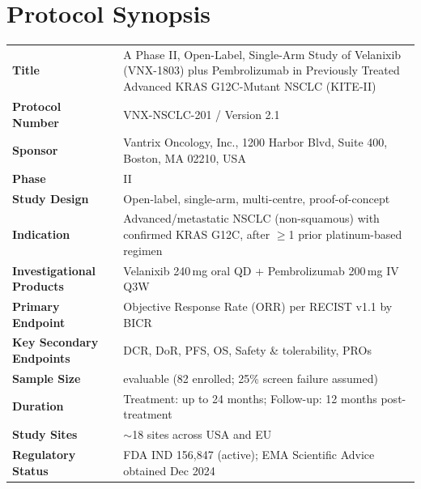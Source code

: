\section{Protocol Synopsis}
\label{sec:synopsis}

\renewcommand{\arraystretch}{1.5}
\begin{tabularx}{\linewidth}{@{}>{\color{accent}\bfseries}l@{\hspace{8mm}}>{\raggedright\arraybackslash}X@{}}
  \toprule
  Title & A Phase II, Open-Label, Single-Arm Study of Velanixib (VNX-1803) plus Pembrolizumab in Previously Treated Advanced KRAS G12C-Mutant NSCLC (KITE-II) \\[2pt]
  Protocol Number & VNX-NSCLC-201 / Version 2.1 \\[2pt]
  Sponsor & Vantrix Oncology, Inc., 1200 Harbor Blvd, Suite 400, Boston, MA 02210, USA \\[2pt]
  Phase & II \\[2pt]
  Study Design & Open-label, single-arm, multi-centre, proof-of-concept \\[2pt]
  Indication & Advanced/metastatic NSCLC (non-squamous) with confirmed KRAS G12C, after $\geq$1 prior platinum-based regimen \\[2pt]
  Investigational Products & Velanixib 240\,mg oral QD + Pembrolizumab 200\,mg IV Q3W \\[2pt]
  Primary Endpoint & Objective Response Rate (ORR) per RECIST v1.1 by BICR \\[2pt]
  Key Secondary Endpoints & DCR, DoR, PFS, OS, Safety \& tolerability, PROs \\[2pt]
  Sample Size & 62 evaluable (82 enrolled; 25\% screen failure assumed) \\[2pt]
  Duration & Treatment: up to 24 months; Follow-up: 12 months post-treatment \\[2pt]
  Study Sites & $\sim$18 sites across USA and EU \\[2pt]
  Regulatory Status & FDA IND 156,847 (active); EMA Scientific Advice obtained Dec 2024 \\[2pt]
  \bottomrule
\end{tabularx}
\renewcommand{\arraystretch}{1.35}

